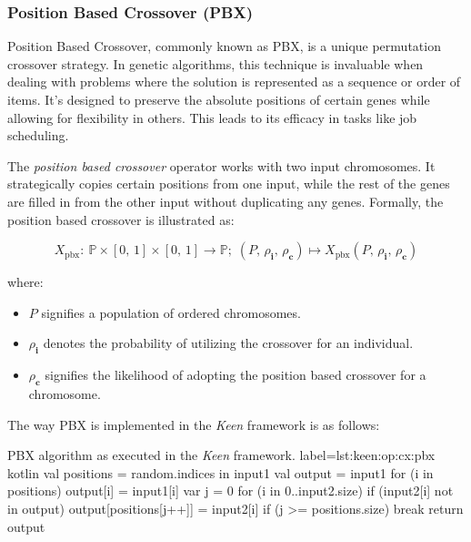 
\subsubsection{Position Based Crossover (PBX)}
\label{sec:keen:op:cx:pbx}
  Position Based Crossover, commonly known as PBX, is a unique permutation 
  crossover strategy. In genetic algorithms, this technique is invaluable when 
  dealing with problems where the solution is represented as a sequence or order 
  of items. It's designed to preserve the absolute positions of certain genes 
  while allowing for flexibility in others. This leads to its efficacy in tasks 
  like job scheduling.

  \begin{definition}
    The \textit{position based crossover} operator works with two input 
    chromosomes. It strategically copies certain positions from one input, while 
    the rest of the genes are filled in from the other input without duplicating 
    any genes. Formally, the position based crossover is illustrated as:

    \begin{equation}
      X_\mathrm{pbx} :\: 
        \mathbb{P} \times [0,\, 1] \times [0,\, 1] \rightarrow \mathbb{P};\;
        (P,\, \rho_\textbf{i},\, \rho_\mathbf{c})
          \mapsto X_\mathrm{pbx}(P,\, \rho_\textbf{i},\, \rho_\mathbf{c})
    \end{equation}

    where:

    \begin{itemize}
      \item \(P\) signifies a population of ordered chromosomes.
      \item \(\rho_\textbf{i}\) denotes the probability of utilizing the crossover for an individual.
      \item \(\rho_\mathbf{c}\) signifies the likelihood of adopting the position based crossover for a chromosome.
    \end{itemize}
  \end{definition}

  The way PBX is implemented in the \textit{Keen} framework is as follows:

  \begin{code}{
      PBX algorithm as executed in the \textit{Keen} framework.
  }{
      label={lst:keen:op:cx:pbx}
  }{kotlin}
    val positions = random.indices in input1
    val output = input1
    for (i in positions) {
        output[i] = input1[i]
    }
    var j = 0
    for (i in 0..input2.size) {
        if (input2[i] not in output) {
            output[positions[j++]] = input2[i]
            if (j >= positions.size) {
                break
            }
        }
    }
    return output
  \end{code}

